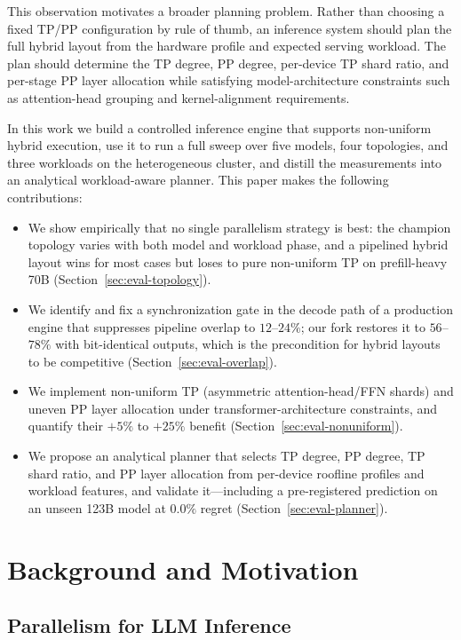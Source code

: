 \documentclass[twocolumn]{article}
\begin{document}
This observation motivates a broader planning problem. Rather than choosing a fixed TP/PP configuration by rule of thumb, an inference system should plan the full hybrid layout from the hardware profile and expected serving workload. The plan should determine the TP degree, PP degree, per-device TP shard ratio, and per-stage PP layer allocation while satisfying model-architecture constraints such as attention-head grouping and kernel-alignment requirements.

In this work we build a controlled inference engine that supports non-uniform hybrid execution, use it to run a full sweep over five models, four topologies, and three workloads on the heterogeneous cluster, and distill the measurements into an analytical workload-aware planner. This paper makes the following contributions:
\begin{itemize}[leftmargin=*, itemsep=0.2em, topsep=0.3em, parsep=0em]
    \item We show empirically that no single parallelism strategy is best: the champion topology varies with both model and workload phase, and a pipelined hybrid layout wins for most cases but loses to pure non-uniform TP on prefill-heavy 70B (Section~\ref{sec:eval-topology}).
    \item We identify and fix a synchronization gate in the decode path of a production engine that suppresses pipeline overlap to $12$--$24\%$; our fork restores it to $56$--$78\%$ with bit-identical outputs, which is the precondition for hybrid layouts to be competitive (Section~\ref{sec:eval-overlap}).
    \item We implement non-uniform TP (asymmetric attention-head/FFN shards) and uneven PP layer allocation under transformer-architecture constraints, and quantify their $+5\%$ to $+25\%$ benefit (Section~\ref{sec:eval-nonuniform}).
    \item We propose an analytical planner that selects TP degree, PP degree, TP shard ratio, and PP layer allocation from per-device roofline profiles and workload features, and validate it---including a pre-registered prediction on an unseen 123B model at $0.0\%$ regret (Section~\ref{sec:eval-planner}).
\end{itemize}

\section{Background and Motivation}

\subsection{Parallelism for LLM Inference}
\end{document}
